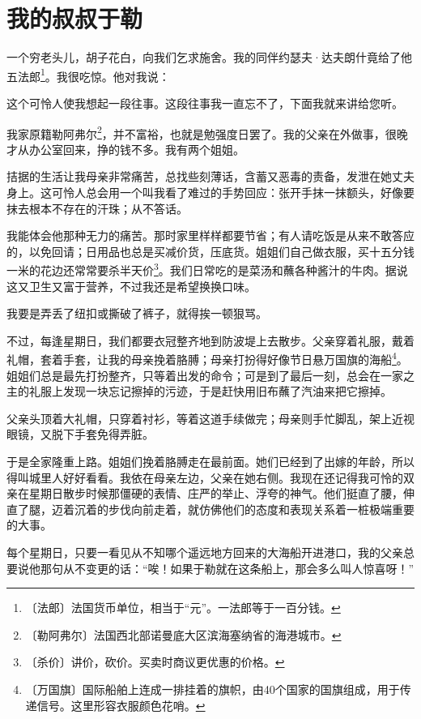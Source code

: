 \documentclass[12pt,UTF-8,openany]{ctexbook}
\begin{document}
\chapter{我的叔叔于勒}

\begin{normalsize}
    
    一个穷老头儿，胡子花白，向我们乞求施舍。我的同伴约瑟夫·达夫朗什竟给了他五法郎\footnote{〔法郎〕法国货币单位，相当于“元”。一法郎等于一百分钱。}。我很吃惊。他对我说：
    
    这个可怜人使我想起一段往事。这段往事我一直忘不了，下面我就来讲给您听。
    
    我家原籍勒阿弗尔\footnote{〔勒阿弗尔〕法国西北部诺曼底大区滨海塞纳省的海港城市。}，并不富裕，也就是勉强度日罢了。我的父亲在外做事，很晚才从办公室回来，挣的钱不多。我有两个姐姐。
    
    拮据的生活让我母亲非常痛苦，总找些刻薄话，含蓄又恶毒的责备，发泄在她丈夫身上。这可怜人总会用一个叫我看了难过的手势回应：张开手抹一抹额头，好像要抹去根本不存在的汗珠；从不答话。
    
    我能体会他那种无力的痛苦。那时家里样样都要节省；有人请吃饭是从来不敢答应的，以免回请；日用品也总是买减价货，压底货。姐姐们自己做衣服，买十五分钱一米的花边还常常要杀半天价\footnote{〔杀价〕讲价，砍价。买卖时商议更优惠的价格。}。我们日常吃的是菜汤和蘸各种酱汁的牛肉。据说这又卫生又富于营养，不过我还是希望换换口味。
    
    我要是弄丢了纽扣或撕破了裤子，就得挨一顿狠骂。
    
    不过，每逢星期日，我们都要衣冠整齐地到防波堤上去散步。父亲穿着礼服，戴着礼帽，套着手套，让我的母亲挽着胳膊；母亲打扮得好像节日悬万国旗的海船\footnote{〔万国旗〕国际船舶上连成一排挂着的旗帜，由40个国家的国旗组成，用于传递信号。这里形容衣服颜色花哨。}。姐姐们总是最先打扮整齐，只等着出发的命令；可是到了最后一刻，总会在一家之主的礼服上发现一块忘记擦掉的污迹，于是赶快用旧布蘸了汽油来把它擦掉。
    
    父亲头顶着大礼帽，只穿着衬衫，等着这道手续做完；母亲则手忙脚乱，架上近视眼镜，又脱下手套免得弄脏。
    
    于是全家隆重上路。姐姐们挽着胳膊走在最前面。她们已经到了出嫁的年龄，所以得叫城里人好好看看。我依在母亲左边，父亲在她右侧。我现在还记得我可怜的双亲在星期日散步时候那僵硬的表情、庄严的举止、浮夸的神气。他们挺直了腰，伸直了腿，迈着沉着的步伐向前走着，就仿佛他们的态度和表现关系着一桩极端重要的大事。
    
    每个星期日，只要一看见从不知哪个遥远地方回来的大海船开进港口，我的父亲总要说他那句从不变更的话：“唉！如果于勒就在这条船上，那会多么叫人惊喜呀！”
    

\end{normalsize}
\end{document}
